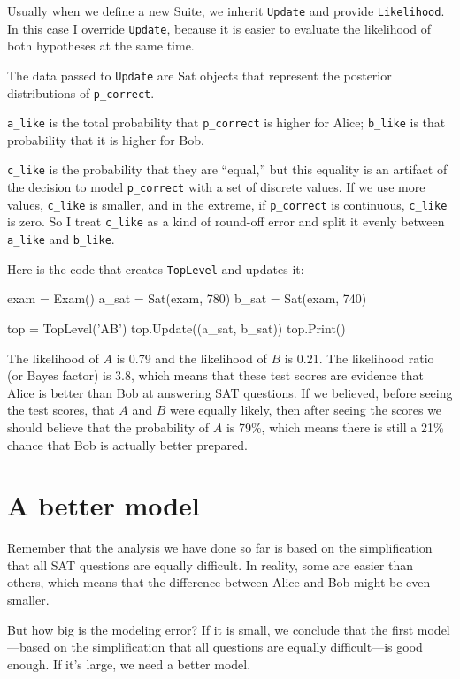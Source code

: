 \documentclass[12pt]{book}
\theoremstyle{exercise}
\newcommand{\py}[1]{{\tt #1}}%
\begin{document}
Usually when we define a new Suite, we inherit \py{Update}
and provide \py{Likelihood}.  In this case I override \py{Update},
because it is easier to evaluate the likelihood of both
hypotheses at the same time.

The data passed to \py{Update} are Sat objects that represent
the posterior distributions of \verb"p_correct".

\verb"a_like" is the total probability that
\verb"p_correct" is higher for Alice; \verb"b_like" is that
probability that it is higher for Bob.

\verb"c_like" is the probability that they are ``equal,'' but this
equality is an artifact of the decision to model \verb"p_correct" with
a set of discrete values.  If we use more values, \verb"c_like"
is smaller, and in the extreme, if \verb"p_correct" is
continuous, \verb"c_like" is zero.  So I treat \verb"c_like" as
a kind of round-off error and split it evenly between \verb"a_like"
and \verb"b_like".

Here is the code that creates \py{TopLevel} and updates it:

\begin{code}
    exam = Exam()
    a_sat = Sat(exam, 780)
    b_sat = Sat(exam, 740)

    top = TopLevel('AB')
    top.Update((a_sat, b_sat))
    top.Print()
\end{code}

The likelihood of $A$ is 0.79 and the likelihood of $B$ is 0.21.  The
likelihood ratio (or Bayes factor) is 3.8, which means that these test
scores are evidence that Alice is better than Bob at answering SAT
questions.  If we believed, before seeing the test scores, that $A$
and $B$ were equally likely, then after seeing the scores we should
believe that the probability of $A$ is 79\%, which means there is
still a 21\% chance that Bob is actually better prepared.


\section{A better model}

Remember that the analysis we have done so far is based on
the simplification that all SAT questions are equally difficult.
In reality, some are easier than others, which means that the
difference between Alice and Bob might be even smaller.

But how big is the modeling error?  If it is small, we conclude
that the first model---based on the simplification that all questions
are equally difficult---is good enough.  If it's large,
we need a better model.
\end{document}
